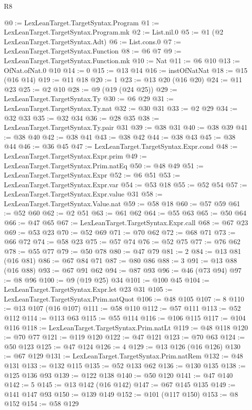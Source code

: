 \begin{lexlean}{R8}
\begin{coremodule}
@0 := LexLeanTarget.TargetSyntax.Program
@1 := LexLeanTarget.TargetSyntax.Program.mk
@2 := List.nil.{0}
@5 := @1 (@2 LexLeanTarget.TargetSyntax.Adt)
@6 := List.cons.{0}
@7 := LexLeanTarget.TargetSyntax.Function
@8 := @6 @7
@9 := LexLeanTarget.TargetSyntax.Function.mk
@10 := Nat
@11 := @6 @10
@13 := OfNat.ofNat.{0} @10
@14 := 0
@15 := @13 @14
@16 := instOfNatNat
@18 := @15 (@16 @14)
@19 := @11 @18
@20 := 1
@23 := @13 @20 (@16 @20)
@24 := @11 @23
@25 := @2 @10
@28 := @9 (@19 (@24 @25))
@29 := LexLeanTarget.TargetSyntax.Ty
@30 := @6 @29
@31 := LexLeanTarget.TargetSyntax.Ty.nat
@32 := @30 @31
@33 := @2 @29
@34 := @32 @33
@35 := @32 @34
@36 := @28 @35
@38 := LexLeanTarget.TargetSyntax.Ty.pair @31
@39 := @38 @31
@40 := @38 @39
@41 := @38 @40
@42 := @38 @41
@43 := @38 @42
@44 := @38 @43
@45 := @38 @44
@46 := @36 @45
@47 := LexLeanTarget.TargetSyntax.Expr.cond
@48 := LexLeanTarget.TargetSyntax.Expr.prim
@49 := LexLeanTarget.TargetSyntax.Prim.natEq
@50 := @48 @49
@51 := LexLeanTarget.TargetSyntax.Expr
@52 := @6 @51
@53 := LexLeanTarget.TargetSyntax.Expr.var
@54 := @53 @18
@55 := @52 @54
@57 := LexLeanTarget.TargetSyntax.Expr.value @31
@58 := LexLeanTarget.TargetSyntax.Value.nat
@59 := @58 @18
@60 := @57 @59
@61 := @52 @60
@62 := @2 @51
@63 := @61 @62
@64 := @55 @63
@65 := @50 @64
@66 := @47 @65
@67 := LexLeanTarget.TargetSyntax.Expr.call
@68 := @67 @23
@69 := @53 @23
@70 := @52 @69
@71 := @70 @62
@72 := @68 @71
@73 := @66 @72
@74 := @58 @23
@75 := @57 @74
@76 := @52 @75
@77 := @76 @62
@78 := @55 @77
@79 := @50 @78
@80 := @47 @79
@81 := 2
@84 := @13 @81 (@16 @81)
@86 := @67 @84 @71
@87 := @80 @86
@88 := 3
@91 := @13 @88 (@16 @88)
@93 := @67 @91 @62
@94 := @87 @93
@96 := @46 (@73 @94)
@97 := @8 @96
@100 := @9 (@19 @25) @34
@101 := @100 @45
@104 := LexLeanTarget.TargetSyntax.Expr.let @23 @31
@105 := LexLeanTarget.TargetSyntax.Prim.natQuot
@106 := @48 @105
@107 := 8
@110 := @13 @107 (@16 @107)
@111 := @58 @110
@112 := @57 @111
@113 := @52 @112
@114 := @113 @63
@115 := @55 @114
@116 := @106 @115
@117 := @104 @116
@118 := LexLeanTarget.TargetSyntax.Prim.natLt
@119 := @48 @118
@120 := @70 @77
@121 := @119 @120
@122 := @47 @121
@123 := @70 @63
@124 := @50 @123
@125 := @47 @124
@126 := 4
@129 := @13 @126 (@16 @126)
@130 := @67 @129
@131 := LexLeanTarget.TargetSyntax.Prim.natRem
@132 := @48 @131
@133 := @132 @115
@135 := @52 @133 @62
@136 := @130 @135
@138 := @125 @136 @93
@139 := @122 @138
@140 := @50 @120
@141 := @47 @140
@142 := 5
@145 := @13 @142 (@16 @142)
@147 := @67 @145 @135
@149 := @141 @147 @93
@150 := @139 @149
@152 := @101 (@117 @150)
@153 := @8 @152
@154 := @58 @129

\end{coremodule}
\end{lexlean}
